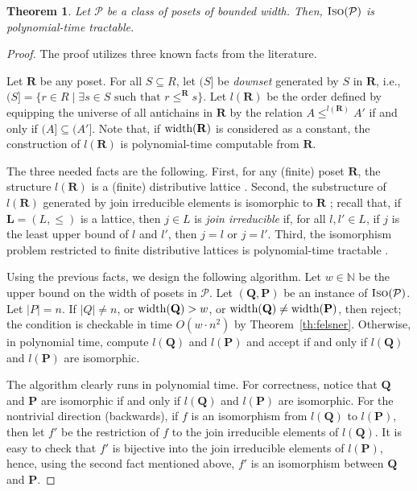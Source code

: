 \documentclass[usletter]{article}
\newcommand{\pp}{\mathbf{P}}
\newcommand{\qq}{\mathbf{Q}}
\newtheorem{theorem}{Theorem}
\begin{document}
\begin{theorem}\label{th:isoptime}
Let $\mathcal{P}$ be a class of posets of bounded width.  Then, 
$\textsc{Iso}(\mathcal{P})$ is polynomial-time tractable.
\end{theorem}
\begin{proof}
The proof utilizes three known facts from the literature.  

Let $\mathbf{R}$ be any poset.  
For all $S \subseteq R$, let 
$(S]$ be \emph{downset} generated by $S$ in  $\mathbf{R}$, i.e., 
 $(S]=\{ r \in R \mid \exists s \in S \text{ such that $r \leq^{\mathbf{R}} s$}\}$.  
Let $l(\mathbf{R})$ be the order defined 
by equipping the universe of all antichains in $\mathbf{R}$ 
by the relation $A \leq^{l(\mathbf{R})} A'$ if and only if 
$(A]\subseteq (A']$.  Note that, if $\textup{width}(\mathbf{R})$ 
is considered as a constant, the construction of $l(\mathbf{R})$ 
is polynomial-time computable from $\mathbf{R}$. 

The three needed facts are the following.  First, for any (finite) poset $\mathbf{R}$, 
the structure $l(\mathbf{R})$ is a (finite) distributive lattice \cite[Proposition~5.5.5]{Schroder03}.  
Second, the substructure of $l(\mathbf{R})$ 
generated by join irreducible elements is isomorphic to $\mathbf{R}$ \cite[Theorem~5.5.6]{Schroder03}; 
recall that, if $\mathbf{L}=(L,\leq)$ is a lattice, 
then $j \in L$ is \emph{join irreducible} if, for all $l,l' \in L$, 
if $j$ is the least upper bound of $l$ and $l'$, then $j=l$ or $j=l'$.   
Third, the isomorphism problem restricted to finite distributive lattices 
is polynomial-time tractable \cite{GorazdIdziak95}.  

Using the previous facts, we design the following algorithm.
Let $w \in \mathbb{N}$ be the upper bound on the width of posets in $\mathcal{P}$.  
Let $(\mathbf{Q},\mathbf{P})$ be an instance of $\textsc{Iso}(\mathcal{P})$.  Let $|P|=n$.  
If $|Q| \neq n$, or $\textup{width}(\mathbf{Q})>w$, 
or $\textup{width}(\mathbf{Q}) \neq \textup{width}(\mathbf{P})$, then reject; 
the condition is checkable in time $O(w \cdot n^2)$ by Theorem~\ref{th:felsner}.  
Otherwise, in polynomial time, 
compute $l(\qq)$ and $l(\pp)$ 
and accept if and only if $l(\qq)$ and $l(\pp)$ are isomorphic.  

The algorithm clearly runs in polynomial time.  For correctness, 
notice that $\qq$ and $\pp$ are isomorphic if and only if 
$l(\qq)$ and $l(\pp)$ are isomorphic.  For the nontrivial direction (backwards), 
if $f$ is an isomorphism from $l(\qq)$ to $l(\pp)$, 
then let $f'$ be the restriction of $f$ to the join irreducible elements 
of $l(\qq)$.  It is easy to check that $f'$ is bijective into 
the join irreducible elements of $l(\pp)$, hence, 
using the second fact mentioned above, 
$f'$ is an isomorphism between $\qq$ and $\pp$.
\end{proof}
\end{document}
